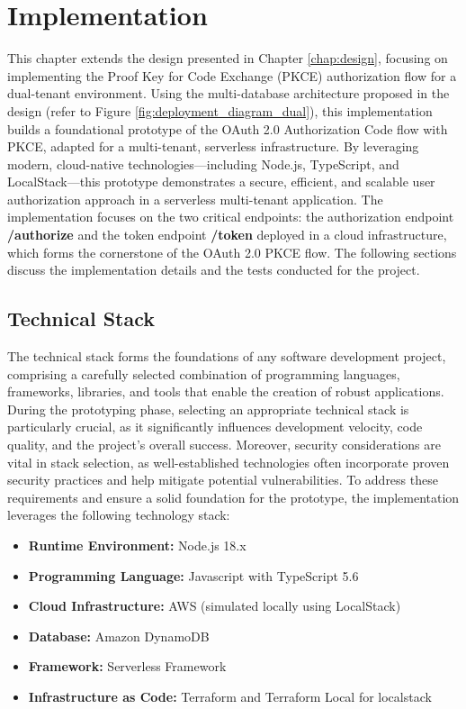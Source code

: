 \chapter{Implementation}

This chapter extends the design presented in Chapter \ref{chap:design}, focusing on implementing the Proof Key for Code Exchange (PKCE) authorization flow for a dual-tenant environment. Using the multi-database architecture proposed in the design (refer to Figure \ref{fig:deployment_diagram_dual}), this implementation builds a foundational prototype of the OAuth 2.0 Authorization Code flow with PKCE, adapted for a multi-tenant, serverless infrastructure. By leveraging modern, cloud-native technologies—including Node.js, TypeScript, and LocalStack—this prototype demonstrates a secure, efficient, and scalable user authorization approach in a serverless multi-tenant application. The implementation focuses on the two critical endpoints: the authorization endpoint \textbf{/authorize} and the token endpoint \textbf{/token} deployed in a cloud infrastructure, which forms the cornerstone of the OAuth 2.0 PKCE flow. The following sections discuss the implementation details and the tests conducted for the project.


\section{Technical Stack}
The technical stack forms the foundations of any software development project, comprising a carefully selected combination of programming languages, frameworks, libraries, and tools that enable the creation of robust applications. During the prototyping phase, selecting an appropriate technical stack is particularly crucial, as it significantly influences development velocity, code quality, and the project's overall success. Moreover, security considerations are vital in stack selection, as well-established technologies often incorporate proven security practices and help mitigate potential vulnerabilities. To address these requirements and ensure a solid foundation for the prototype, the implementation leverages the following technology stack:

\begin{itemize}
    \item \textbf{Runtime Environment:} Node.js 18.x
    \item \textbf{Programming Language:} Javascript with TypeScript 5.6
    \item \textbf{Cloud Infrastructure:} AWS (simulated locally using LocalStack)
    \item \textbf{Database:} Amazon DynamoDB
    \item \textbf{Framework:} Serverless Framework
    \item \textbf{Infrastructure as Code:} Terraform and Terraform Local for localstack

\end{itemize}

